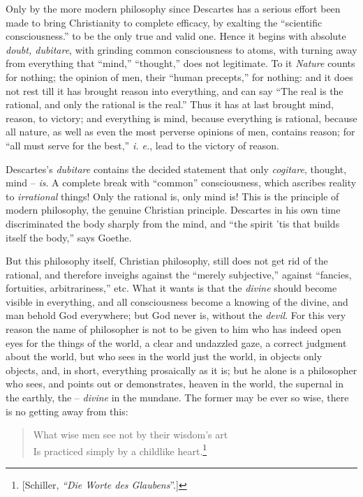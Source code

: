 \documentclass[12pt,a4paper]{book}
\begin{document}
Only by the more modern philosophy since Descartes has a serious effort been 
made to bring Christianity to complete efficacy, by exalting the ``scientific 
consciousness.'' to be the only true and valid one. Hence it begins with 
absolute \textit{doubt, dubitare}, with grinding common consciousness to 
atoms, with turning away from everything that ``mind,'' ``thought,'' does 
not legitimate. To it \textit{Nature} counts for nothing; the opinion of men, 
their ``human precepts,'' for nothing: and it does not rest till it has 
brought reason into everything, and can say ``The real is the rational, and 
only the rational is the real.'' Thus it has at last brought mind, reason, to 
victory; and everything is mind, because everything is rational, because all 
nature, as well as even the most perverse opinions of men, contains reason; 
for ``all must serve for the best,'' \textit{i. e.}, lead to the victory of 
reason.

Descartes's \textit{dubitare} contains the decided statement that only 
\textit{cogitare}, thought, mind -- \textit{is}. A complete break with 
``common'' consciousness, which ascribes reality to \textit{irrational} 
things! Only the rational is, only mind is! This is the principle of modern 
philosophy, the genuine Christian principle. Descartes in his own time 
discriminated the body sharply from the mind, and ``the spirit 'tis that 
builds itself the body,'' says Goethe.

But this philosophy itself, Christian philosophy, still does not get rid of 
the rational, and therefore inveighs against the ``merely subjective,'' 
against ``fancies, fortuities, arbitrariness,'' etc. What it wants is that 
the \textit{divine} should become visible in everything, and all consciousness 
become a knowing of the divine, and man behold God everywhere; but God never 
is, without the \textit{devil}. For this very reason the name of philosopher 
is not to be given to him who has indeed open eyes for the things of the 
world, a clear and undazzled gaze, a correct judgment about the world, but who 
sees in the world just the world, in objects only objects, and, in short, 
everything prosaically as it is; but he alone is a philosopher who sees, and 
points out or demonstrates, heaven in the world, the supernal in the earthly, 
the -- \textit{divine} in the mundane. The former may be ever so wise, there 
is no getting away from this:

\begin{quotation}

\noindent{}What wise men see not by their wisdom's art\\
 Is practiced simply by a childlike heart.\footnote{[Schiller, \textit{``Die 
Worte des Glaubens}''.]}\end{quotation}
\end{document}

